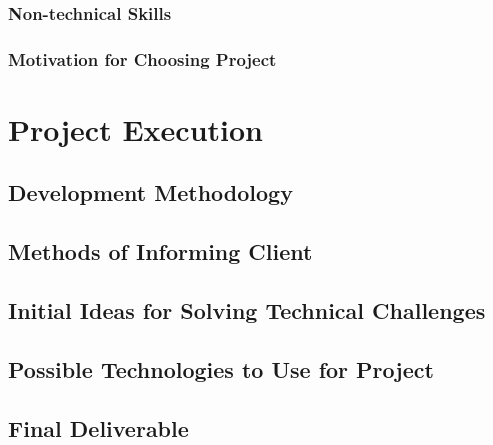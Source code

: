 \documentclass{article}
\begin{document}
		\subsubsection{Non-technical Skills}
		\subsubsection{Motivation for Choosing Project}

\cleardoublepage
    
\section{Project Execution}
	\subsection{Development Methodology}
	\subsection{Methods of Informing Client}
	\subsection{Initial Ideas for Solving Technical Challenges}
	\subsection{Possible Technologies to Use for Project}
	\subsection{Final Deliverable}
\end{document}
